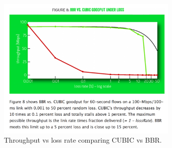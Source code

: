\begin{figure}[h]
  \centering
  \includegraphics[height=7cm]{./img/bbr_fig8.png}
  \caption{Throughput vs loss rate comparing CUBIC vs BBR.}
  \label{fig:bbr8}
\end{figure}
